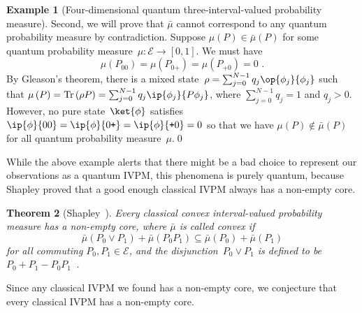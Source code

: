 \documentclass[english,reprint, aps, prl,superscriptaddress, showpacs,
showkeys, longbibliography, amsmath, amssymb]{revtex4-1}
\theoremstyle{plain}
\newtheorem{thm}{Theorem}
\theoremstyle{definition}
\newtheorem{example}[thm]{Example}
\newcommand{\events}{\ensuremath{\mathcal{E}}}
\newcommand{\proj}[1]{\op{#1}{#1}}
\newcommand{\ps}{\texttt{+}}
\newcommand{\Tr}{\mathop{\mathrm{Tr}}\nolimits}
\begin{document}
\begin{example}[Four-dimensional quantum three-interval-valued probability
measure]
Second, we will prove that $\bar{\mu}$ cannot correspond to any quantum
probability measure by contradiction. Suppose $\mu(P)\in\bar{\mu}(P)$
for some quantum probability measure~$\mu:\events\rightarrow\left[0,1\right]$.
We must have 
\begin{equation}
\mu(P_{00})=\mu(P_{0\ps})=\mu(P_{\ps0})=0\textrm{ .}\label{eq:probability-zero-on-states}
\end{equation}
By Gleason's theorem, there is a mixed state~$\rho=\sum_{j=0}^{N-1}q_{j}\proj{\phi_{j}}$
such that $\mu\left(P\right)=\Tr\left(\rho P\right)=\sum_{j=0}^{N-1}q_{j}\ip{\phi_{j}}{P\phi_{j}}$,
where $\sum_{j=0}^{N-1}q_{j}=1$ and $q_{j}>0$. However, no pure
state~$\ket{\phi}$ satisfies $\ip{\phi}{00}=\ip{\phi}{0\ps}=\ip{\phi}{\ps0}=0$
so that we have $\mu(P)\notin\bar{\mu}(P)$ for all quantum probability
measure~$\mu$.\qed\end{example}

While the above example alerts that there might be a bad choice to
represent our observations as a quantum IVPM, this phenomena is purely
quantum, because Shapley proved that a good enough classical IVPM
always has a non-empty core.

\begin{thm}[Shapley~\cite{Shapley1971,Grabisch2016}]\label{thm:Shapley}Every
classical convex interval-valued probability measure has a non-empty
core, where $\bar{\mu}$ is called convex if 
\begin{equation}
\bar{\mu}\left(P_{0}\vee P_{1}\right)+\bar{\mu}\left(P_{0}P_{1}\right)\subseteq\bar{\mu}\left(P_{0}\right)+\bar{\mu}\left(P_{1}\right)\label{eq:QuantumInterval-valuedProbability-Convex}
\end{equation}
for all commuting $P_{0},P_{1}\in\events$, and the \emph{disjunction}~$P_{0}\vee P_{1}$
is defined to be $P_{0}+P_{1}-P_{0}P_{1}$~\cite{Griffiths2003}.\end{thm}

Since any classical IVPM we found has a non-empty core, we conjecture
that every classical IVPM has a non-empty core.


\end{document}
